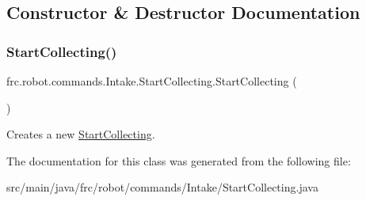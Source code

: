 \subsection{Constructor \& Destructor Documentation}
\mbox{\label{classfrc_1_1robot_1_1commands_1_1_intake_1_1_start_collecting_ab11c6e2edcad126246d41a0f09ee2461}} 
\subsubsection{\texorpdfstring{StartCollecting()}{StartCollecting()}}
{\footnotesize\ttfamily frc.\+robot.\+commands.\+Intake.\+Start\+Collecting.\+Start\+Collecting (\begin{DoxyParamCaption}{ }\end{DoxyParamCaption})\hspace{0.3cm}{\ttfamily [inline]}}

Creates a new \mbox{\hyperlink{classfrc_1_1robot_1_1commands_1_1_intake_1_1_start_collecting}{Start\+Collecting}}. 

The documentation for this class was generated from the following file\+:\begin{DoxyCompactItemize}
\item 
src/main/java/frc/robot/commands/\+Intake/Start\+Collecting.\+java\end{DoxyCompactItemize}
